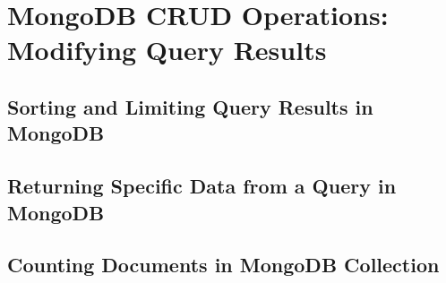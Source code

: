 \documentclass[../main.tex]{subfiles}
\begin{document}
\chapter{MongoDB CRUD Operations: Modifying Query Results}
\section{Sorting and Limiting Query Results in MongoDB}
\section{Returning Specific Data from a Query in MongoDB}
\section{Counting Documents in MongoDB Collection}

\printglossaries
\end{document}
